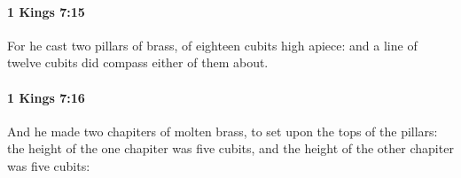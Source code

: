		\paragraph{1 Kings 7:15} %
			\label{1KINGS-7-15}

			For he cast two pillars of brass, of eighteen cubits high apiece: and a line of twelve cubits did compass either of them about.


		\paragraph{1 Kings 7:16} %
			\label{1KINGS-7-16}

			And he made two chapiters of molten brass, to set upon the tops of the pillars: the height of the one chapiter was five cubits, and the height of the other chapiter was five cubits:


